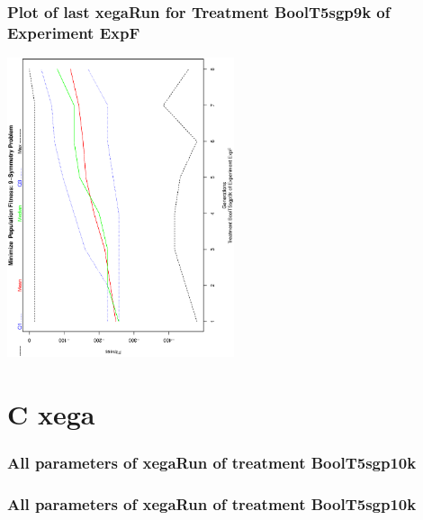 \documentclass[18pt,c]{beamer}
\begin{document}
 \begin{frame}
 \frametitle{ Plot of last xegaRun for Treatment BoolT5sgp9k of Experiment ExpF }
 \begin{center}
\includegraphics[width=0.5\textwidth, angle=-90]
{ExpFPlotPopStatsFigure010.eps}
 \end{center}
 \label{report/ExpFPlotPopStatsFigure010.eps}  
 \end{frame}

\clearpage
\section{C xega}

 \begin{frame}
 \fontsize{8pt}{9pt}\selectfont
 \frametitle{  All parameters of xegaRun of treatment BoolT5sgp10k 
 }

 \label{ExpFtParmTable044.tex}  
 \end{frame}


 \begin{frame}
 \fontsize{8pt}{9pt}\selectfont
 \frametitle{  All parameters of xegaRun of treatment BoolT5sgp10k 
 }

 \label{ExpFtParmTable045.tex}  
 \end{frame}
\end{document}

